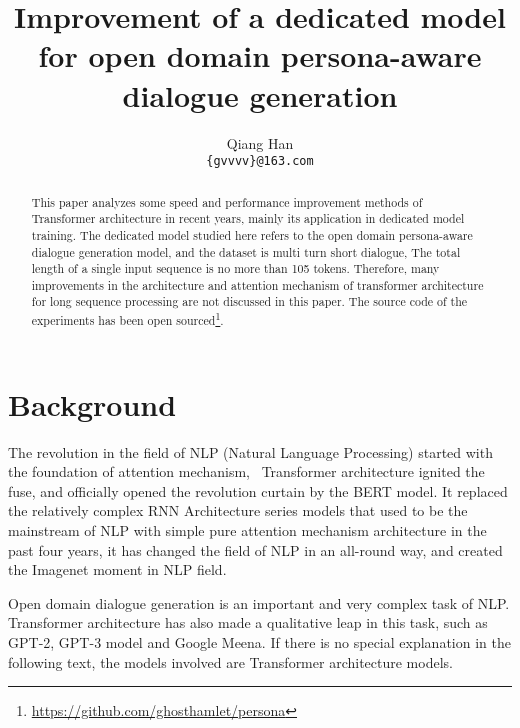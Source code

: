 \documentclass[letterpaper]{article} %
\DeclareRobustCommand{\citeext}[1]{\cite[#1]{#1}}
\begin{document}
\title{Improvement of a dedicated model for open domain persona-aware dialogue generation}
\author{Qiang Han \\
{\tt \{gvvvv\}@163.com} \\}

\maketitle
\begin{abstract}
This paper analyzes some speed and performance improvement methods of Transformer architecture in recent years, mainly its application in dedicated model training. The dedicated model studied here refers to the open domain persona-aware dialogue generation model, and the dataset is multi turn short dialogue, The total length of a single input sequence is no more than 105 tokens. Therefore, many improvements in the architecture and attention mechanism of transformer architecture for long sequence processing are not discussed in this paper. The source code of the experiments has been open sourced\footnote{\url{https://github.com/ghosthamlet/persona}}. 
\end{abstract}

\section[Background]{Background} 
The revolution in the field of NLP (Natural Language Processing) started with the foundation of attention mechanism\citeext {Bahdanau2015}, ~Transformer architecture\citeext{Vaswani2017} ignited the fuse, and officially opened the revolution curtain by the BERT model\citeext{Devlin2019}. It replaced the relatively complex RNN Architecture series models that used to be the mainstream of NLP with simple pure attention mechanism architecture in the past four years, it has changed the field of NLP in an all-round way, and created the Imagenet moment\citeext{ruder2018nlpimagenet} in NLP field. 

Open domain dialogue generation is an important and very complex task of NLP. Transformer architecture has also made a qualitative leap in this task, such as GPT-2, GPT-3 model and Google Meena\citeext{Radford2019, Brown2020, Adiwardana2020}. If there is no special explanation in the following text, the models involved are Transformer architecture models. 
\end{document}
